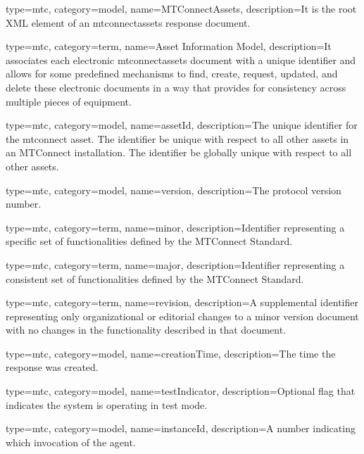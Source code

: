 {
  type=mtc,
  category=model,
  name={MTConnectAssets},
  description={It is the root XML element of an \gls{mtconnectassets response document}.}
}


{
  type=mtc,
  category=term,
  name={Asset Information Model},
  description={It associates each electronic \gls{mtconnectassets} document with a unique identifier and allows for some predefined mechanisms to find, create, request, updated, and delete these electronic documents in a way that provides for consistency across multiple pieces of equipment.}
}


{
  type=mtc,
  category=model,
  name={assetId},
  description={The unique identifier for the \gls{mtconnect asset}. The identifier \MUST be unique with respect to all other \glspl{asset} in an MTConnect installation. The identifier \SHOULD be globally unique with respect to all other \glspl{asset}.}
}


{
  type=mtc,
  category=model,
  name={version},
  description={The protocol version number.}
}

{
  type=mtc,
  category=term,
  name={minor},
  description={Identifier representing a specific set of functionalities defined by the MTConnect Standard.}
}



{
  type=mtc,
  category=term,
  name={major},
  description={Identifier representing a consistent set of functionalities defined by the MTConnect Standard. }
}

{
  type=mtc,
  category=term,
  name={revision},
  description={A supplemental identifier representing only organizational or editorial changes to a \gls{minor} version document with no changes in the functionality described in that document.}
}



{
  type=mtc,
  category=model,
  name={creationTime},
  description={The time the response was created.}
}


{
  type=mtc,
  category=model,
  name={testIndicator},
  description={Optional flag that indicates the system is operating in test mode.}
}


{
  type=mtc,
  category=model,
  name={instanceId},
  description={A number indicating which invocation of the \gls{agent}. }
}


